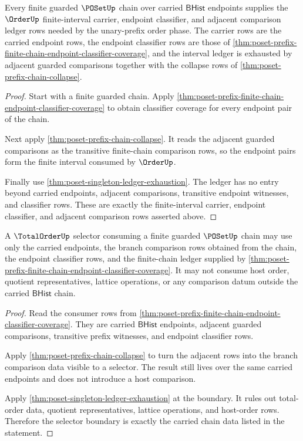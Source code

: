 \begin{theorem}
\label{thm:poset-prefix-chain-orderup-interval-coverage}
Every finite guarded $\POSetUp$ chain over carried $\mathsf{BHist}$ endpoints
supplies the $\OrderUp$ finite-interval carrier, endpoint classifier, and
adjacent comparison ledger rows needed by the unary-prefix order phase. The
carrier rows are the carried endpoint rows, the endpoint classifier rows are
those of
\autoref{thm:poset-prefix-finite-chain-endpoint-classifier-coverage}, and the
interval ledger is exhausted by adjacent guarded comparisons together with
the collapse rows of \autoref{thm:poset-prefix-chain-collapse}.
\end{theorem}
\begin{proof}
Start with a finite guarded chain. Apply
\autoref{thm:poset-prefix-finite-chain-endpoint-classifier-coverage} to obtain
classifier coverage for every endpoint pair of the chain.

Next apply \autoref{thm:poset-prefix-chain-collapse}. It reads the adjacent
guarded comparisons as the transitive finite-chain comparison rows, so the
endpoint pairs form the finite interval consumed by $\OrderUp$.

Finally use \autoref{thm:poset-singleton-ledger-exhaustion}. The ledger has no
entry beyond carried endpoints, adjacent comparisons, transitive endpoint
witnesses, and classifier rows. These are exactly the finite-interval carrier,
endpoint classifier, and adjacent comparison rows asserted above.
\end{proof}

\begin{theorem}
\label{thm:poset-prefix-chain-totalorder-selector-consumer-boundary}
A $\TotalOrderUp$ selector consuming a finite guarded $\POSetUp$ chain may use
only the carried endpoints, the branch comparison rows obtained from the
chain, the endpoint classifier rows, and the finite-chain ledger supplied by
\autoref{thm:poset-prefix-finite-chain-endpoint-classifier-coverage}. It may
not consume host order, quotient representatives, lattice operations, or any
comparison datum outside the carried $\mathsf{BHist}$ chain.
\end{theorem}
\begin{proof}
Read the consumer rows from
\autoref{thm:poset-prefix-finite-chain-endpoint-classifier-coverage}. They are
carried $\mathsf{BHist}$ endpoints, adjacent guarded comparisons, transitive
prefix witnesses, and endpoint classifier rows.

Apply \autoref{thm:poset-prefix-chain-collapse} to turn the adjacent rows into
the branch comparison data visible to a selector. The result still lives over
the same carried endpoints and does not introduce a host comparison.

Apply \autoref{thm:poset-singleton-ledger-exhaustion} at the boundary. It
rules out total-order data, quotient representatives, lattice operations, and
host-order rows. Therefore the selector boundary is exactly the carried chain
data listed in the statement.
\end{proof}

